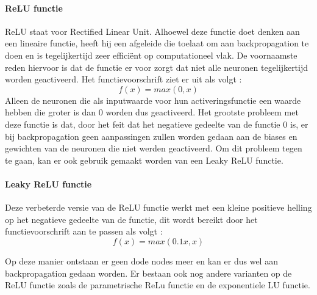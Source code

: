 {\paragraph{ReLU functie}
ReLU staat voor Rectified Linear Unit. Alhoewel deze functie doet denken aan een lineaire functie, heeft hij een afgeleide die toelaat om aan backpropagation te doen en is tegelijkertijd zeer efficiënt op computationeel  vlak. De voornaamste reden hiervoor is dat de functie er voor zorgt dat niet alle neuronen tegelijkertijd worden geactiveerd. Het functievoorschrift ziet er uit als volgt : 
\[f(x) = max(0, x)\]
Alleen de neuronen die als inputwaarde voor hun activeringsfunctie een waarde hebben die groter is dan 0 worden dus geactiveerd. Het grootste probleem met deze functie is dat, door het feit dat het negatieve gedeelte van de functie 0 is, er bij backpropagation geen aanpassingen zullen worden gedaan aan de biases en gewichten van de neuronen die niet werden geactiveerd. Om dit probleem tegen te gaan, kan er ook gebruik gemaakt worden van een Leaky ReLU functie. 

\paragraph{Leaky ReLU functie}
Deze verbeterde versie van de ReLU functie werkt met een kleine positieve helling op het negatieve gedeelte van de functie, dit wordt bereikt door het functievoorschrift aan te passen als volgt : 
\[f(x) = max(0.1x, x)\]

Op deze manier ontstaan er geen dode nodes meer en kan er dus wel aan backpropagation gedaan worden. Er bestaan ook nog andere varianten op de ReLU functie zoals de parametrische ReLu functie en de  exponentiele LU functie.
\autocite{Pragati2023} \autocite{Krizhevsky2017} \autocite{LeCun2015}

}
